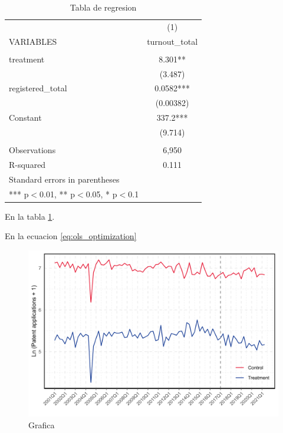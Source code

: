 \documentclass{article}
\begin{document}
\begin{table}[H]
  \centering

    \begin{tabular}{lr}
    \toprule
          & \multicolumn{1}{c}{(1)} \\
    VARIABLES & \multicolumn{1}{c}{turnout\_total} \\
    \midrule
          & \multicolumn{1}{c}{} \\
    treatment & \multicolumn{1}{c}{8.301**} \\
          & \multicolumn{1}{c}{(3.487)} \\
    registered\_total & \multicolumn{1}{c}{0.0582***} \\
          & \multicolumn{1}{c}{(0.00382)} \\
    Constant & \multicolumn{1}{c}{337.2***} \\
          & \multicolumn{1}{c}{(9.714)} \\
          & \multicolumn{1}{c}{} \\
    Observations & \multicolumn{1}{c}{6,950} \\
    R-squared & \multicolumn{1}{c}{0.111} \\
    \midrule
    Standard errors in parentheses &  \\
    *** p$<$0.01, ** p$<$0.05, * p$<$0.1 &  \\
    \end{tabular}%
      \caption{Tabla de regresion}
  \label{tab:regresion}%
\end{table}%

En la tabla \ref{tab:regresion}. 

En la ecuacion \ref{eq:ols_optimization}

\begin{figure}[H]
    \centering
    \includegraphics[scale= 0.8]{quarterly_common_trends.png}
    \caption{Grafica}
    \label{fig:figura-control}
\end{figure}
\end{document}
